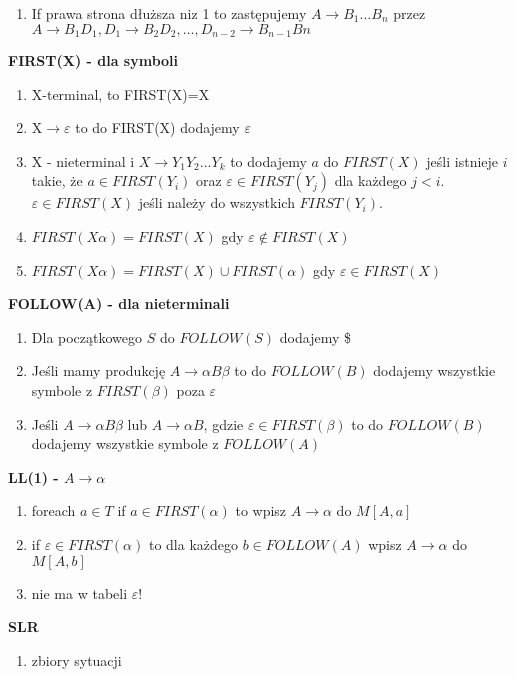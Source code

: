 \begin{multicols}{3}
\begin{enumerate}
      \item If prawa strona dłuższa niz 1 to zastępujemy $A \rightarrow B_{1} \ldots B_{n}$ przez \\
    $A \rightarrow B_{1}D_{1}, D_{1} \rightarrow B_{2}D_{2}, \ldots ,D_{n-2} \rightarrow B_{n-1}B{n}$
    \end{enumerate}
    \textbf{FIRST(X) - dla symboli}
    \begin{enumerate}
      \item X-terminal, to FIRST(X)={X}
      \item X$\rightarrow \varepsilon$ to do FIRST(X) dodajemy $\varepsilon$
      \item X - nieterminal i $X \rightarrow Y_{1}Y_{2}...Y_{k}$ to dodajemy $a$ do $FIRST(X)$ jeśli istnieje $i$ takie, że $a \in FIRST(Y_{i})$ oraz $\varepsilon \in FIRST(Y_{j})$ dla każdego $j<i$. $\varepsilon \in FIRST(X)$ jeśli należy do wszystkich $FIRST(Y_{i})$. 
      \item $FIRST(X\alpha) = FIRST(X)$ gdy $\varepsilon \notin FIRST(X)$
      \item $FIRST(X\alpha) = FIRST(X) \cup FIRST(\alpha)$ gdy $\varepsilon \in FIRST(X)$
    \end{enumerate}
    \textbf{FOLLOW(A) - dla nieterminali}
    \begin{enumerate}
      \item Dla początkowego $S$ do $FOLLOW(S)$ dodajemy \$
      \item Jeśli mamy produkcję $A\rightarrow\alpha B \beta$ to do $FOLLOW(B)$ dodajemy wszystkie symbole z $FIRST(\beta)$ poza $\varepsilon$
      \item Jeśli $A\rightarrow\alpha B \beta$ lub $A\rightarrow\alpha B $, gdzie $\varepsilon \in FIRST(\beta)$ to do $FOLLOW(B)$ dodajemy wszystkie symbole z $FOLLOW(A)$
    \end{enumerate}
    \textbf{LL(1) - $A \rightarrow \alpha$}
    \begin{enumerate}
      \item foreach $a \in T$ if $a \in FIRST(\alpha)$ to wpisz $A\rightarrow \alpha$ do $M[A,a]$
      \item if $\varepsilon \in FIRST(\alpha)$ to dla każdego $b \in FOLLOW(A)$ wpisz $A\rightarrow \alpha$ do $M[A,b]$
      \item nie ma w tabeli $\varepsilon$!
    \end{enumerate}
    \textbf{SLR}
    \begin{enumerate}
      \item zbiory sytuacji

\end{enumerate}
\end{multicols}
